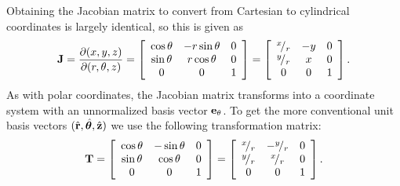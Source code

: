 Obtaining the Jacobian matrix to convert from Cartesian to cylindrical coordinates is largely identical, so this is given as
\begin{align}
  \mathbf{J} = \frac{ \partial ( x, y, z ) }{ \partial ( r, \theta, z) } =
   \left[ \begin{array}{c c c}
   \cos \theta & -r \sin \theta & 0 \\
   \sin \theta &  r \cos \theta & 0 \\ 
             0 &            0 & 1 \\ \end{array} \right] =
   \left[ \begin{array}{c c c}
   {}^{x}\!/_{r} & -y & 0 \\
   {}^{y}\!/_{r} &  x & 0 \\
              0 &  0 & 1 \\ \end{array} \right] .
\end{align}
As with polar coordinates, the Jacobian matrix transforms into a coordinate system with an unnormalized basis vector $\mathbf{e}_\theta$. To get the more conventional unit basis vectors $(\hat{\mathbf{r}}, \hat{\boldsymbol\theta}, \hat{\mathbf{z}})$ we use the following transformation matrix:
\begin{align}
  \mathbf{T} = 
   \left[ \begin{array}{c c c}
   \cos \theta & -\sin \theta & 0 \\
   \sin \theta &  \cos \theta & 0 \\ 
             0 &            0 & 1 \\ \end{array} \right] =
   \left[ \begin{array}{c c c}
   {}^{x}\!/_{r} & -{}^{y}\!/_{r} & 0 \\
   {}^{y}\!/_{r} &  {}^{x}\!/_{r} & 0 \\
              0 &             0 & 1 \\ \end{array} \right] .
\end{align}

